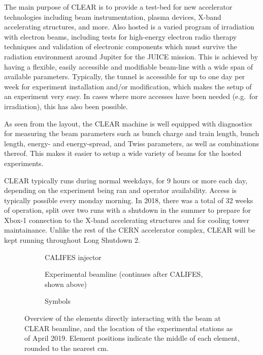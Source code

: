 \documentclass[a4paper,
               keeplastbox,   %
               ]{jacow}
\begin{document}
The main purpose of CLEAR is to provide a test-bed for new accelerator technologies including beam instrumentation, plasma devices, X-band accelerating structures, and more.
Also hosted is a varied program of irradiation with electron beams, including tests for high-energy electron radio therapy techniques and validation of electronic components which must survive the radiation environment around Jupiter for the JUICE mission.
This is achieved by having a flexible, easily accessible and modifiable beam-line with a wide span of available parameters.
Typically, the tunnel is accessible for up to one day per week for experiment installation and/or modification, which makes the setup of an experiment very easy.
In cases where more accesses have been needed (e.g.\ for irradiation), this has also been possible.

As seen from the layout, the CLEAR machine is well equipped with diagnostics for measuring the beam parameters such as bunch charge and train length, bunch length, energy- and energy-spread, and Twiss parameters, as well as combinations thereof.
This makes it easier to setup a wide variety of beams for the hosted experiments.

CLEAR typically runs during normal weekdays, for 9 hours or more each day, depending on the experiment being ran and operator availability.
Access is typically possible every monday morning.
In 2018, there was a total of 32 weeks of operation, split over two runs with a shutdown in the summer to prepare for Xbox-1 connection to the X-band accelerating structures and for cooling tower maintainance.
Unlike the rest of the CERN accelerator complex, CLEAR will be kept running throughout Long Shutdown 2.

\begin{figure}[t]
  \centering
  \begin{subfigure}{\textwidth}
    \centering
    
    \vspace{-2.5em} %
    \caption{CALIFES injector}
  \end{subfigure}
  \begin{subfigure}{\textwidth}
    \centering
    \vspace{-1em}
    
    \vspace{-0.5em}
    \caption{Experimental beamline
      (continues after CALIFES, shown above)}
  \end{subfigure}
  \begin{subfigure}{\textwidth}
    \centering
    \vspace{-0.5em}
    
    \vspace{-2em} %
    \caption{Symbols}
  \end{subfigure}
  \caption{Overview of the elements directly interacting with the beam at CLEAR beamline, and the location of the experimental stations as of April 2019. Element positions indicate the middle of each element, rounded to the nearest cm.}
  \label{fig:layout}
\end{figure}
\end{document}
